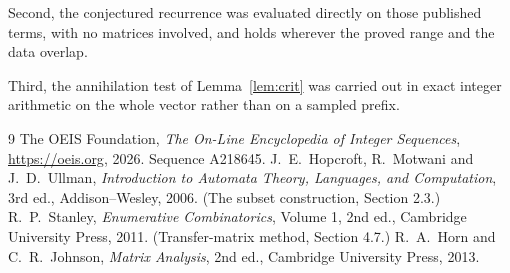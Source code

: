 \documentclass[11pt,a4paper]{article}
\theoremstyle{plain}
\theoremstyle{definition}
\begin{document}
Second, the conjectured recurrence was evaluated directly on those published terms, with no
matrices involved, and holds wherever the proved range and the data overlap.

Third, the annihilation test of Lemma~\ref{lem:crit} was carried out in exact integer
arithmetic on the whole vector rather than on a sampled prefix.

\begin{thebibliography}{9}
 The OEIS Foundation, \emph{The On-Line Encyclopedia of Integer
Sequences}, \url{https://oeis.org}, 2026. Sequence A218645.
 J.~E.~Hopcroft, R.~Motwani and J.~D.~Ullman, \emph{Introduction to Automata
Theory, Languages, and Computation}, 3rd ed., Addison--Wesley, 2006. (The subset
construction, Section 2.3.)
 R.~P.~Stanley, \emph{Enumerative Combinatorics}, Volume 1, 2nd ed.,
Cambridge University Press, 2011. (Transfer-matrix method, Section 4.7.)
 R.~A.~Horn and C.~R.~Johnson, \emph{Matrix Analysis}, 2nd ed., Cambridge
University Press, 2013.
\end{thebibliography}
\end{document}
